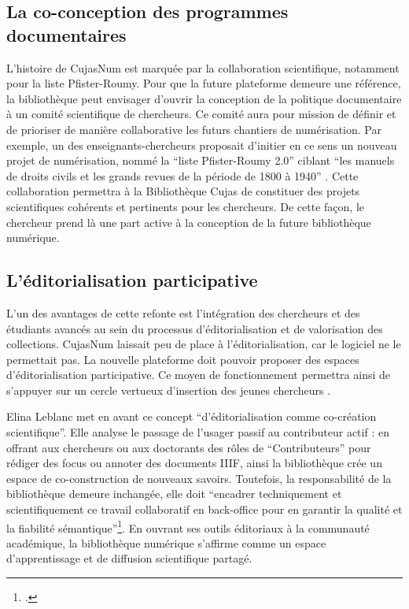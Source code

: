 \subsection{La co-conception des programmes documentaires}
L'histoire de CujasNum est marquée par la collaboration scientifique, notamment pour la liste Pfister-Roumy. Pour que la future plateforme demeure une référence, la bibliothèque peut envisager d'ouvrir la conception de la politique documentaire à un comité scientifique de chercheurs. Ce comité aura pour mission de définir et de prioriser de manière collaborative les futurs chantiers de numérisation. Par exemple, un des enseignants-chercheurs proposait d'initier en ce sens un nouveau projet de numérisation, nommé la \enquote{liste Pfister-Roumy 2.0} ciblant \enquote{les manuels de droits civils et les grands revues de la période de 1800 à 1940} . Cette collaboration permettra à la Bibliothèque Cujas de constituer des projets scientifiques cohérents et pertinents pour les chercheurs. De cette façon, le chercheur prend là une part active à la conception de la future bibliothèque numérique.

\subsection{L'éditorialisation participative}
L'un des avantages de cette refonte est l'intégration des chercheurs et des étudiants avancés au sein du processus d'éditorialisation et de valorisation des collections. CujasNum laissait peu de place à l'éditorialisation, car le logiciel ne le permettait pas. La nouvelle plateforme doit pouvoir proposer des espaces d'éditorialisation participative. Ce moyen de fonctionnement permettra ainsi de s'appuyer sur un cercle vertueux d'insertion des jeunes chercheurs .

Elina Leblanc met en avant ce concept \enquote{d'éditorialisation comme co-création scientifique}. Elle analyse le passage de l'usager passif au contributeur actif : en offrant aux chercheurs ou aux doctorants des rôles de \enquote{Contributeurs} pour rédiger des focus ou annoter des documents \ac{IIIF}, ainsi la bibliothèque crée un espace de co-construction de nouveaux savoirs. Toutefois, la responsabilité de la bibliothèque demeure inchangée, elle doit \enquote{encadrer techniquement et scientifiquement ce travail collaboratif en back-office pour en garantir la qualité et la fiabilité sémantique}\footcite{leblancBibliothequesNumeriquesEnrichies}. En ouvrant ses outils éditoriaux à la communauté académique, la bibliothèque numérique s'affirme comme un espace d'apprentissage et de diffusion scientifique partagé.
\bigskip

